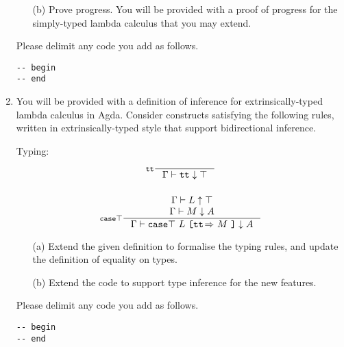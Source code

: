 \documentclass{examhons2018}
\begin{document}
\begin{enumerate}
\begin{enumerate}
\item[(b)] Prove progress. You will be provided with a proof of progress for
           the simply-typed lambda calculus that you may extend.
\end{enumerate}

Please delimit any code you add as follows.
\begin{verbatim}
-- begin
-- end
\end{verbatim}

\newpage

\item \rubricqC

\newcommand{\TT}{\texttt{tt}}
\newcommand{\CASETOP}{{\texttt{case}\top}}
\newcommand{\casetop}[2]{\CASETOP~#1~{\texttt{[tt}\!\Rightarrow}~#2~\texttt{]}}
\newcommand{\up}{\uparrow}
\newcommand{\dn}{\downarrow}

You will be provided with a definition of inference for extrinsically-typed lambda
calculus in Agda. Consider constructs satisfying the following rules,
written in extrinsically-typed style that support bidirectional inference.

Typing:
\begin{gather*}
\inference[$\TT$]
  {}
  {\Gamma \vdash \TT \dn \top}
\\~\\
\inference[$\CASETOP$]
  {\Gamma \vdash L \up \top \\
   \Gamma \vdash M \dn A}
  {\Gamma \vdash \casetop{L}{M} \dn A}
\end{gather*}

\begin{enumerate}
\item[(a)] Extend the given definition to formalise the typing rules,
      and update the definition of equality on types.

\item[(b)] Extend the code to support type inference for the new features.
\end{enumerate}

Please delimit any code you add as follows.
\begin{verbatim}
-- begin
-- end
\end{verbatim}

\end{enumerate}

%
%
\end{document}
